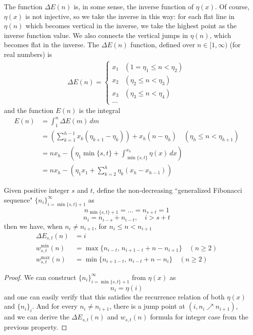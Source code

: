 \documentclass[]{article}
\begin{document}
The function $\Delta E(n)$ is, in some sense, the inverse function of $\eta(x)$. Of course, $\eta(x)$ is not injective, so we take the inverse in this way: for each flat line in $\eta(n)$ which becomes vertical in the inverse, we take the highest point as the inverse function value. We also connects the vertical jumps in $\eta(n)$, which becomes flat in the inverse. The $\Delta E(n)$ function, defined over $n \in [1, \infty)$ (for real numbers) is
\begin{align*}
\Delta E(n) = \begin{cases}
x_1 & (1 = \eta_1 \le n < \eta_2) \\
x_2 & (\eta_2 \le n < \eta_3) \\
x_3 & (\eta_3 \le n < \eta_4) \\
\dots
\end{cases}
\end{align*}
and the function $E(n)$ is the integral 
\begin{align*}
E(n) &= \int_1^n \Delta E(m)\, dm \\
 &= \left(\sum_{k = 1}^{h-1} x_k (\eta_{k+1} - \eta_k)\right) + x_{h} (n - \eta_{h}) \quad (\eta_{h} \le n < \eta_{h+1}) \\
 &= n x_h - \left(\eta_1 \min\{s, t\} + \int_{\min\{s, t\}}^{x_h} \eta(x)\, dx\right)\\
 &= n x_h  - \left(\eta_1 x_1 + \sum_{k=2}^{h} \eta_k (x_{h} - x_{h-1})\right)
\end{align*}

\vspace{1cm}
\begin{lemma}[Fibonacci]
	Given positive integer $s$ and $t$, define the non-decreasing ``generalized Fibonacci sequence" $\{n_i\}_{i=\min\{s,t\}+1}^\infty$ as
	\[
	n_{\min\{s,t\}+1} = \dots = n_{s + t} = 1
	\]
	\[
	n_{i} = n_{i - s} + n_{i - t} , \quad i > s + t
	\]
	then we have, when $n_i \neq n_{i+1}$, for $n_i \le n < n_{i+1}$
	\begin{align*}
	\Delta E_{s,t}(n) &= i\\
	w^{\min}_{s,t}(n) &= \max\{n_{i - t},\, n_{i +1 - t} + n - n_{i+1}\}\quad(n\geq 2)	\\
	w^{\max}_{s,t}(n) &= \min\{n_{i +1 - t},\,n_{i - t} + n - n_{i} \} \quad(n\geq 2)
	\end{align*}
\end{lemma}
\begin{proof}
	We can construct $\{n_i\}_{i=\min\{s,t\}+1}^{\infty}$ from $\eta(x)$ as
	\[
	n_i = \eta(i)
	\]
	and one can easily verify that this satisfies the recurrence relation of both $\eta(x)$ and $\{n_i\}_{i}$. And for every $n_i \neq n_{i+1}$, there is a jump point at $(i,n_i\nearrow n_{i+1})$, and we can derive the $\Delta E_{s,t}(n)$ and $w_{s,t}(n)$ formula for integer case from the previous property.
	
\end{proof}	
\end{document}
